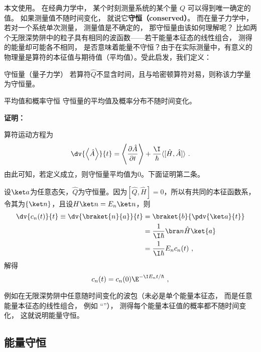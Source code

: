
本文使用。 在经典力学中， 某个时刻测量系统的某个量 $Q$ 可以得到唯一确定的值。 如果测量值不随时间变化， 就说它\textbf{守恒（conserved）}。 而在量子力学中， 若对一个系统单次测量， 测量值是不确定的， 那守恒量由该如何理解呢？ 比如两个无限深势阱中的粒子具有相同的波函数——若干能量本征态的线性组合， 测得的能量却可能各不相同， 是否意味着能量不守恒？由于在实际测量中，有意义的物理量是算符的本征值与期待值（平均值）。受此启发，我们定义：
\begin{definition}{守恒量（量子力学）}\label{def_QMcons_1}
若算符$\hat Q$不显含时间，且与哈密顿算符对易，则称该力学量为守恒量。
\end{definition}
\begin{corollary}{平均值和概率守恒}
守恒量的平均值及概率分布不随时间变化。
\end{corollary}
\textbf{证明：}

算符运动方程为
\begin{equation}
\dv{\left\langle \hat A \right\rangle}{t}=\left\langle\frac{\partial \hat A}{\partial t}\right\rangle+\frac{\I}{\hbar}\langle[\hat H, \hat A]\rangle~.
\end{equation}
由此可知，若定义成立，则守恒量平均值为0。下面证明第二条。

设$\ket a$为任意态矢，$\hat Q$为守恒量。因为$[\hat Q,\hat H]=0$，所以有共同的本征函数系，令其为$\{\ket n\}$，且设$H\ket n=E_n\ket n$，则
\begin{equation}
\begin{aligned}
\dv{c_n(t)}{t}\equiv\dv{\braket{n}{a}}{t}&=\braket{b}{\pdv{\ket a}{t}}\\
&=\frac{1}{\I\hbar}\bra n \hat H\ket{a}\\
&=\frac{1}{\I\hbar}E_nc_n(t)~,
\end{aligned}
\end{equation}
解得
\begin{equation}
c_n(t)=c_n(0)\E^{-\I E_n t/\hbar }~,
\end{equation}


例如在无限深势阱中任意随时间变化的波包（未必是单个能量本征态， 而是任意能量本征态的线性组合， 例如 “”）， 测得每个能量本征值的概率都不随时间变化， 这就说明能量守恒。
\subsection{能量守恒}

